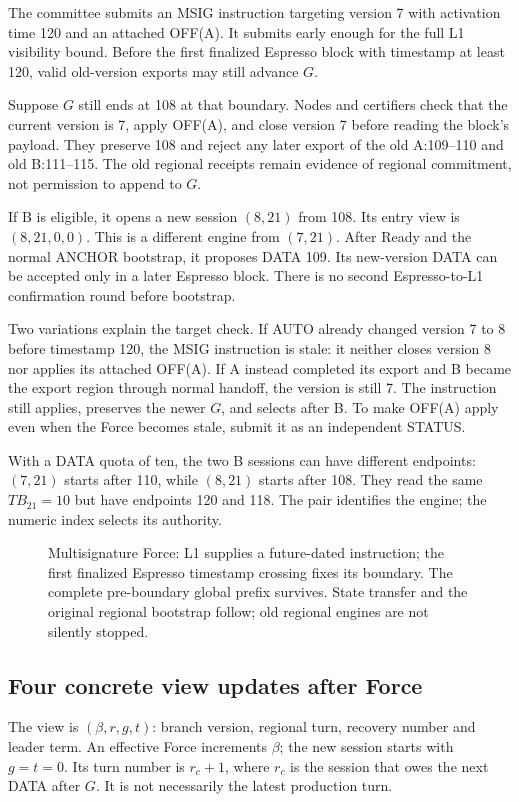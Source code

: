 \documentclass[11pt,a4paper]{article}
\newcommand{\TB}{\mathit{TB}}
\begin{document}
The committee submits an MSIG instruction targeting version 7 with
activation time 120 and an attached OFF(A). It submits early enough
for the full L1 visibility bound. Before the first finalized Espresso
block with timestamp at least 120, valid old-version exports may still
advance $G$.

Suppose $G$ still ends at 108 at that boundary. Nodes and certifiers
check that the current version is 7, apply OFF(A), and close version 7
before reading the block's payload. They preserve 108 and reject any
later export of the old A:109--110 and old B:111--115. The old regional
receipts remain evidence of regional commitment, not permission to
append to $G$.

If B is eligible, it opens a new session $(8,21)$ from 108. Its entry
view is $(8,21,0,0)$. This is a different engine from $(7,21)$.
After Ready and the normal ANCHOR bootstrap, it proposes DATA 109.
Its new-version DATA can be accepted only in a later Espresso block.
There is no second Espresso-to-L1 confirmation round before bootstrap.

Two variations explain the target check. If AUTO already changed
version 7 to 8 before timestamp 120, the MSIG instruction is stale:
it neither closes version 8 nor applies its attached OFF(A). If A
instead completed its export and B became the export region through
normal handoff, the version is still 7. The instruction still applies,
preserves the newer $G$, and selects after B. To make OFF(A) apply even
when the Force becomes stale, submit it as an independent STATUS.

With a DATA quota of ten, the two B sessions can have different
endpoints: $(7,21)$ starts after 110, while $(8,21)$ starts after 108.
They read the same $\TB_{21}=10$ but have endpoints 120 and 118.
The pair identifies the engine; the numeric index selects its authority.

\begin{figure}[htbp]\centering

\caption{Multisignature Force: L1 supplies a future-dated instruction;
the first finalized Espresso timestamp crossing fixes its boundary.
The complete pre-boundary global prefix survives. State transfer and
the original regional bootstrap follow; old regional engines are not
silently stopped.}
\label{fig:forced-cross-region}
\end{figure}

\FloatBarrier
\subsection{Four concrete view updates after Force}
\label{sec:force-view-examples}
The view is $(\beta,r,g,t)$: branch version, regional turn,
recovery number and leader term. An effective Force increments $\beta$;
the new session starts with $g=t=0$. Its turn number is $r_c+1$, where
$r_c$ is the session that owes the next DATA after $G$. It is not
necessarily the latest production turn.
\end{document}
